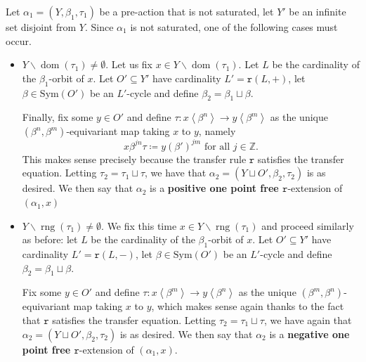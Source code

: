 \documentclass[12pt]{article}
\numberwithin{equation}{section}
\theoremstyle{definition}
\DeclareMathOperator{\dom}{\mathrm{dom}}
\DeclareMathOperator{\rng}{\mathrm{rng}}
\newcommand{\Z}{\mathbb{Z}}
\newcommand{\la}{\left\langle}
\newcommand{\ra}{\right\rangle}
\newcommand{\Sym}{\mathrm{Sym}}
\newcommand{\trrule}{\mathtt{r}}
\begin{document}
	
	Let \( \alpha_1 = (Y, \beta_1, \tau_1) \) be a pre-action that is not saturated,
	let \(Y'\) be an infinite set disjoint from \(Y\).
	Since \(\alpha_1\) is not saturated, one of the following cases must occur.
\begin{itemize}
\item \(Y \smallsetminus \dom(\tau_1)\neq \emptyset\).
		Let us fix \(x\in Y \smallsetminus \dom(\tau_1)\).
		Let \(L\) be the cardinality of the \(\beta_1\)-orbit of \(x\).
		Let \(O'\subseteq Y'\) have cardinality \(L'=\trrule (L,+)\), 
		let  \(\beta\in \Sym(O')\) be an \(L'\)-cycle
		and define \(\beta_2=\beta_1\sqcup \beta\).
		
		Finally, fix some \(y\in O'\) and define \(\tau: x\la {\beta}^n\ra \to y\la {\beta}^m\ra\)
		as the unique \((\beta^n,\beta^m)\)-equivariant map taking \(x\) to \(y\), namely
		\[
		x\beta^{jn}\tau \coloneqq y {(\beta')}^{jm} \text{ for all } j\in \Z.
		\]
		This makes sense precisely because the transfer rule \( \trrule \)
		satisfies the transfer equation.
		Letting \(\tau_2=\tau_1\sqcup \tau\), we have that 
		\( \alpha_2=(Y\sqcup O', \beta_2,\tau_2) \) is as desired. 
		We then say that \(\alpha_2\) is a \textbf{positive one point free \(\trrule\)}-extension
		of \((\alpha_1,x)\)
\item  $Y \smallsetminus \rng(\tau_1)\neq \emptyset$.
		We fix this time \(x\in Y \smallsetminus \rng(\tau_1)\) and 
		proceed similarly as before: 
		let \(L\) be the cardinality of the \(\beta_1\)-orbit of \(x\).
		Let \(O'\subseteq Y'\) have cardinality \(L'=\trrule (L,-)\), 
		let  \(\beta\in \Sym(O')\) be an \(L'\)-cycle
		and define \(\beta_2=\beta_1\sqcup \beta\).
		
		Fix some \(y\in O'\) and define \(\tau: x\la \beta^m\ra \to y\la \beta^n\ra\)
		as the unique \((\beta^m,\beta^n)\)-equivariant map taking \(x\) to \(y\), which
		makes sense again thanks to the fact that \( \trrule \)
		satisfies the transfer equation.
		Letting \(\tau_2=\tau_1\sqcup \tau\), we have again that 
		\( \alpha_2=(Y\sqcup O', \beta_2,\tau_2) \) is as desired.
	We then say that \(\alpha_2\) is a \textbf{negative one point free \(\trrule\)}-extension
		of \((\alpha_1,x)\).
\end{itemize}
\end{document}
